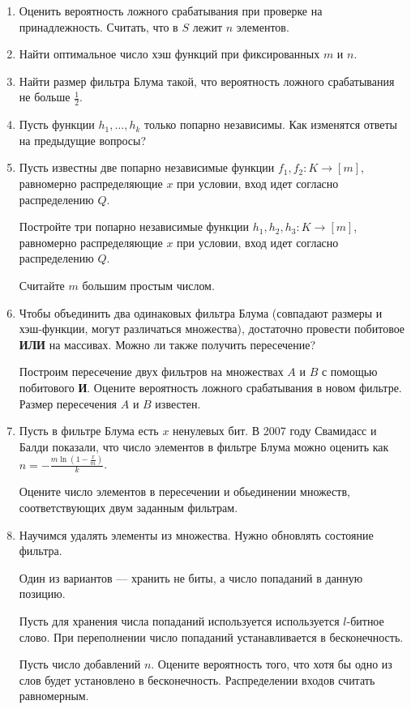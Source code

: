 \begin{itemize}
    \begin{enumerate}
      \item
        Оценить вероятность ложного срабатывания при проверке на принадлежность.
        Считать, что в $S$ лежит $n$ элементов.
      \item
        Найти оптимальное число хэш функций при фиксированных $m$ и $n$.
      \item
        Найти размер фильтра Блума такой, что вероятность ложного
        срабатывания не больше $\frac{1}{2}$.
      \item
        Пусть функции $h_1, …, h_k$ только попарно независимы. Как изменятся 
        ответы на предыдущие вопросы?
      \item
        Пусть известны две попарно независимые функции $f_1, f_2 : K \rightarrow [m]$,
        равномерно распределяющие $x$ при условии, вход идет согласно распределению $Q$.
        
        Постройте три попарно независимые функции $h_1, h_2, h_3: K \rightarrow [m]$,
        равномерно распределяющие $x$ при условии, вход идет согласно распределению $Q$.

        Считайте $m$ большим простым числом.
      \item
        Чтобы объединить два одинаковых фильтра Блума (совпадают размеры и 
        хэш-функции, могут различаться множества), достаточно провести 
        побитовое \textbf{ИЛИ} на массивах. Можно ли также получить 
        пересечение?

        Построим пересечение двух фильтров на множествах $A$ и $B$ с помощью 
        побитового \textbf{И}. Оцените вероятность ложного срабатывания 
        в новом фильтре. Размер пересечения $A$ и $B$ известен.

      \item
        Пусть в фильтре Блума есть $x$ ненулевых бит. В 2007 году Свамидасс и Балди 
        показали, что число элементов в фильтре Блума можно оценить как $n =
        -\frac{m\ln{(1-\frac{x}{m})}}{k}$.
        
        Оцените число элементов в пересечении и обьединении множеств, соответствующих 
        двум заданным фильтрам.

      \item
        Научимся удалять элементы из множества. Нужно обновлять состояние 
        фильтра.
        
        Один из вариантов --- хранить не биты, а число попаданий в данную 
        позицию. 

        Пусть для хранения числа попаданий используется используется $l$-битное 
        слово. При переполнении число попаданий устанавливается в бесконечность.

        Пусть число добавлений $n$. Оцените вероятность того, что хотя бы одно 
        из слов будет установлено в бесконечность. Распределении входов считать
        равномерным.
    \end{enumerate}



\end{itemize}


